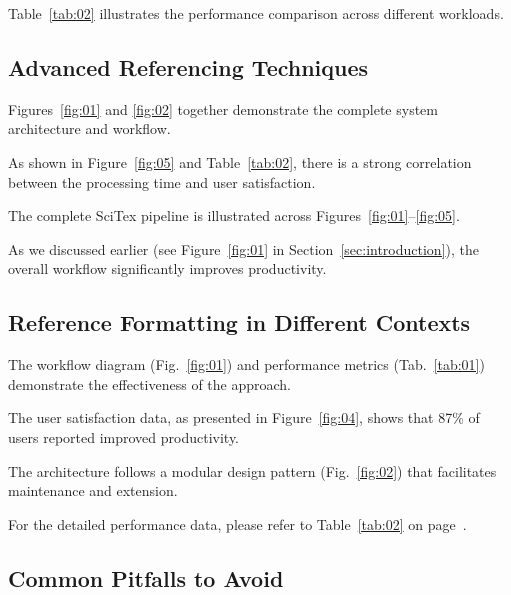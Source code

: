 Table~\ref{tab:02} illustrates the performance comparison across different workloads.

\subsection{Advanced Referencing Techniques}

Figures~\ref{fig:01} and \ref{fig:02} together demonstrate the complete system architecture and workflow.

As shown in Figure~\ref{fig:05} and Table~\ref{tab:02}, there is a strong correlation between the processing time and user satisfaction.

The complete SciTex pipeline is illustrated across Figures~\ref{fig:01}--\ref{fig:05}.

As we discussed earlier (see Figure~\ref{fig:01} in Section~\ref{sec:introduction}), the overall workflow significantly improves productivity.

\subsection{Reference Formatting in Different Contexts}

The workflow diagram (Fig.~\ref{fig:01}) and performance metrics (Tab.~\ref{tab:01}) demonstrate the effectiveness of the approach.

The user satisfaction data, as presented in Figure~\ref{fig:04}, shows that 87\% of users reported improved productivity.

The architecture follows a modular design pattern (Fig.~\ref{fig:02}) that facilitates maintenance and extension.

For the detailed performance data, please refer to Table~\ref{tab:02} on page~\pageref{tab:02}.

\subsection{Common Pitfalls to Avoid}





